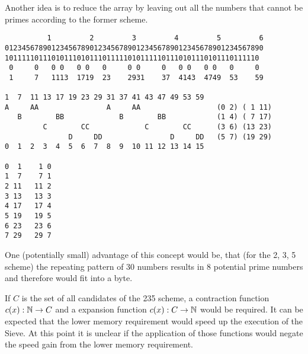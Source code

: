 \documentclass[a4paper,10pt]{article}
\begin{document}

Another idea is to reduce the array by leaving out all the numbers
that cannot be primes according to the former scheme.

\begin{small}
\begin{verbatim}
          1         2         3         4         5         6
0123456789012345678901234567890123456789012345678901234567890
101111101110101110101110111110101111101110101110101110111110
 0     0   0 0   0 0   0     0 0     0   0 0   0 0   0     0
 1     7   1113  1719  23    2931    37  4143  4749  53    59

1  7  11 13 17 19 23 29 31 37 41 43 47 49 53 59
A     AA                A     AA                  (0 2) ( 1 11)
   B        BB             B        BB            (1 4) ( 7 17)
         C        CC             C        CC      (3 6) (13 23)
               D     DD                D     DD   (5 7) (19 29)
0  1  2  3  4  5  6  7  8  9  10 11 12 13 14 15

0  1    1 0
1  7    7 1
2 11   11 2
3 13   13 3
4 17   17 4
5 19   19 5
6 23   23 6
7 29   29 7
\end{verbatim}
\end{small}

One (potentially small) advantage of this concept would be,
that (for the 2, 3, 5 scheme) the repeating pattern of 30 numbers
results in 8 potential prime numbers and therefore would fit into a byte.

If $C$ is the set of all candidates of the 235 scheme,
a contraction function $c(x): \mathbb{N} \rightarrow C$
and a expansion function $c(x): C \rightarrow \mathbb{N}$ would be required.
It can be expected that the lower memory requirement would speed up the
execution of the Sieve.
At this point it is unclear if the application of those functions
would negate the speed gain from the lower memory requirement.
\end{document}
